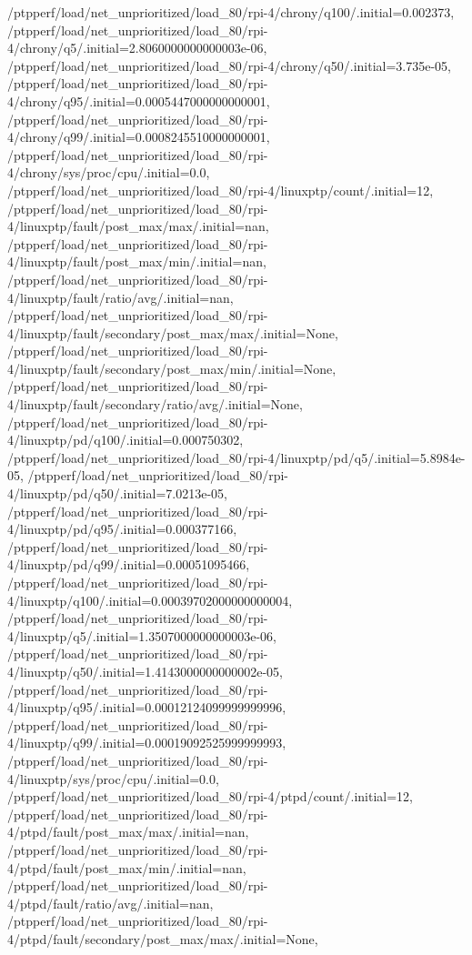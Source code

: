 {    /ptpperf/load/net_unprioritized/load_80/rpi-4/chrony/q100/.initial=0.002373,
    /ptpperf/load/net_unprioritized/load_80/rpi-4/chrony/q5/.initial=2.8060000000000003e-06,
    /ptpperf/load/net_unprioritized/load_80/rpi-4/chrony/q50/.initial=3.735e-05,
    /ptpperf/load/net_unprioritized/load_80/rpi-4/chrony/q95/.initial=0.0005447000000000001,
    /ptpperf/load/net_unprioritized/load_80/rpi-4/chrony/q99/.initial=0.0008245510000000001,
    /ptpperf/load/net_unprioritized/load_80/rpi-4/chrony/sys/proc/cpu/.initial=0.0,
    /ptpperf/load/net_unprioritized/load_80/rpi-4/linuxptp/count/.initial=12,
    /ptpperf/load/net_unprioritized/load_80/rpi-4/linuxptp/fault/post_max/max/.initial=nan,
    /ptpperf/load/net_unprioritized/load_80/rpi-4/linuxptp/fault/post_max/min/.initial=nan,
    /ptpperf/load/net_unprioritized/load_80/rpi-4/linuxptp/fault/ratio/avg/.initial=nan,
    /ptpperf/load/net_unprioritized/load_80/rpi-4/linuxptp/fault/secondary/post_max/max/.initial=None,
    /ptpperf/load/net_unprioritized/load_80/rpi-4/linuxptp/fault/secondary/post_max/min/.initial=None,
    /ptpperf/load/net_unprioritized/load_80/rpi-4/linuxptp/fault/secondary/ratio/avg/.initial=None,
    /ptpperf/load/net_unprioritized/load_80/rpi-4/linuxptp/pd/q100/.initial=0.000750302,
    /ptpperf/load/net_unprioritized/load_80/rpi-4/linuxptp/pd/q5/.initial=5.8984e-05,
    /ptpperf/load/net_unprioritized/load_80/rpi-4/linuxptp/pd/q50/.initial=7.0213e-05,
    /ptpperf/load/net_unprioritized/load_80/rpi-4/linuxptp/pd/q95/.initial=0.000377166,
    /ptpperf/load/net_unprioritized/load_80/rpi-4/linuxptp/pd/q99/.initial=0.00051095466,
    /ptpperf/load/net_unprioritized/load_80/rpi-4/linuxptp/q100/.initial=0.00039702000000000004,
    /ptpperf/load/net_unprioritized/load_80/rpi-4/linuxptp/q5/.initial=1.3507000000000003e-06,
    /ptpperf/load/net_unprioritized/load_80/rpi-4/linuxptp/q50/.initial=1.4143000000000002e-05,
    /ptpperf/load/net_unprioritized/load_80/rpi-4/linuxptp/q95/.initial=0.00012124099999999996,
    /ptpperf/load/net_unprioritized/load_80/rpi-4/linuxptp/q99/.initial=0.00019092525999999993,
    /ptpperf/load/net_unprioritized/load_80/rpi-4/linuxptp/sys/proc/cpu/.initial=0.0,
    /ptpperf/load/net_unprioritized/load_80/rpi-4/ptpd/count/.initial=12,
    /ptpperf/load/net_unprioritized/load_80/rpi-4/ptpd/fault/post_max/max/.initial=nan,
    /ptpperf/load/net_unprioritized/load_80/rpi-4/ptpd/fault/post_max/min/.initial=nan,
    /ptpperf/load/net_unprioritized/load_80/rpi-4/ptpd/fault/ratio/avg/.initial=nan,
    /ptpperf/load/net_unprioritized/load_80/rpi-4/ptpd/fault/secondary/post_max/max/.initial=None,
}
